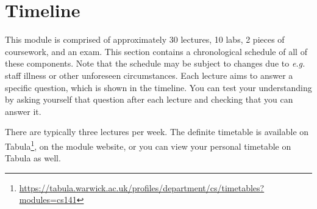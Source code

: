 \section{Timeline}
\label{sec:timeline}

This module is comprised of approximately 30 lectures, 10 labs, 2 pieces of coursework, and an exam. This section contains a chronological schedule of all of these components. Note that the schedule may be subject to changes due to \emph{e.g.} staff illness or other unforeseen circumstances. Each lecture aims to answer a specific question, which is shown in the timeline. You can test your understanding by asking yourself that question after each lecture and checking that you can answer it. 

There are typically three lectures per week. The definite timetable is available on Tabula\footnote{\url{https://tabula.warwick.ac.uk/profiles/department/cs/timetables?modules=cs141}}, on the module website, or you can view your personal timetable on Tabula as well. 

\newcommand{\foo}{\makebox[0pt]{\textbullet}\hskip-0.5pt\vrule width 1pt\hspace{\labelsep}}

\newcommand{\LectureEntry}[4]{#1 & \begin{tabular}{p{11cm}}
		\textbf{#2} \\
		\emph{#3} \\
		#4
\end{tabular}}
\newcommand{\LabEntry}[3]{#1 & \begin{tabular}{p{11cm}}
		\textbf{#2} \\
		#3
\end{tabular}}

